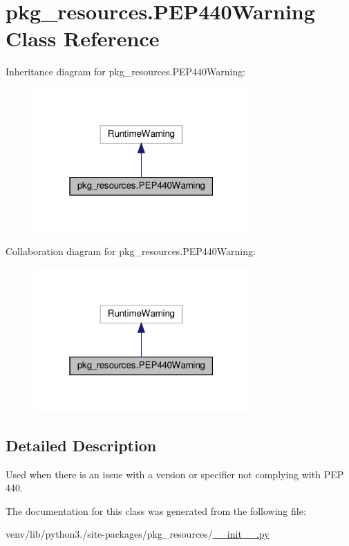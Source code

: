 \hypertarget{classpkg__resources_1_1PEP440Warning}{}\section{pkg\+\_\+resources.\+P\+E\+P440\+Warning Class Reference}
\label{classpkg__resources_1_1PEP440Warning}


Inheritance diagram for pkg\+\_\+resources.\+P\+E\+P440\+Warning\+:
\nopagebreak
\begin{figure}[H]
\begin{center}
\leavevmode
\includegraphics[width=235pt]{classpkg__resources_1_1PEP440Warning__inherit__graph}
\end{center}
\end{figure}


Collaboration diagram for pkg\+\_\+resources.\+P\+E\+P440\+Warning\+:
\nopagebreak
\begin{figure}[H]
\begin{center}
\leavevmode
\includegraphics[width=235pt]{classpkg__resources_1_1PEP440Warning__coll__graph}
\end{center}
\end{figure}


\subsection{Detailed Description}
\begin{DoxyVerb}Used when there is an issue with a version or specifier not complying with
PEP 440.
\end{DoxyVerb}
 

The documentation for this class was generated from the following file\+:\begin{DoxyCompactItemize}
\item 
venv/lib/python3./site-\/packages/pkg\+\_\+resources/\hyperlink{venv_2lib_2python3_89_2site-packages_2pkg__resources_2____init_____8py}{\+\_\+\+\_\+init\+\_\+\+\_\+.\+py}\end{DoxyCompactItemize}
